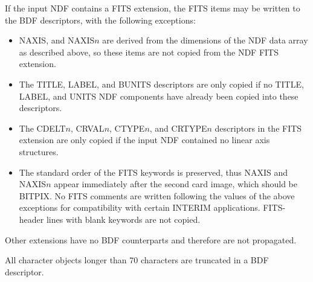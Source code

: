 {{{         \sstitem
            If the input NDF contains a FITS extension, the FITS items
            may be written to the BDF descriptors, with the following
            exceptions:
            \begin{itemize}
               \item NAXIS, and NAXIS$n$ are derived from the dimensions of
               the NDF data array as described above, so these items
               are not copied from the NDF FITS extension.
               \item The TITLE, LABEL, and BUNITS descriptors are only copied
               if no TITLE, LABEL, and UNITS NDF components have already
               been copied into these descriptors.
               \item The CDELT$n$, CRVAL$n$, CTYPE$n$, and CRTYPE$n$
               descriptors in the FITS extension are only copied if the
               input NDF contained no linear axis structures.
               \item The standard order of the FITS keywords is preserved,
               thus NAXIS and NAXIS$n$ appear immediately after the second
               card image, which should be BITPIX.  No FITS comments are
               written following the values of the above exceptions for
               compatibility with certain INTERIM applications.
               FITS-header lines with blank keywords are not copied.
            \end{itemize}

         \sstitem
            Other extensions have no BDF counterparts and therefore are
            not propagated.

         \sstitem
            All character objects longer than 70 characters are
            truncated in a BDF descriptor.
      }
   }
}

